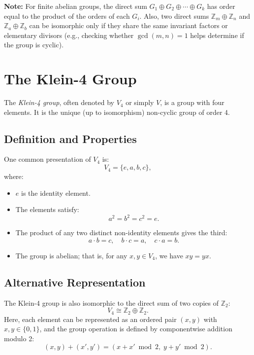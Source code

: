 \documentclass[12pt]{article}
\theoremstyle{definition} %
\theoremstyle{plain} %
\begin{document}
\noindent
\textbf{Note:} For finite abelian groups, the direct sum \(G_1 \oplus G_2 \oplus \cdots \oplus G_k\) 
has order equal to the product of the orders of each \(G_i\). Also, two direct sums 
\(\mathbb{Z}_m \oplus \mathbb{Z}_n\) and \(\mathbb{Z}_a \oplus \mathbb{Z}_b\) can be 
isomorphic only if they share the same invariant factors or elementary divisors 
(e.g., checking whether \(\gcd(m,n) = 1\) helps determine if the group is cyclic).


\section*{The Klein-4 Group}

The \emph{Klein-4 group}, often denoted by \(V_4\) or simply \(V\), is a group with four elements. It is the unique (up to isomorphism) non-cyclic group of order 4.

\subsection*{Definition and Properties}
One common presentation of \(V_4\) is:
\[
V_4 = \{e, a, b, c\},
\]
where:
\begin{itemize}
  \item \(e\) is the identity element.
  \item The elements satisfy:
    \[
      a^2 = b^2 = c^2 = e.
    \]
  \item The product of any two distinct non-identity elements gives the third:
    \[
      a \cdot b = c,\quad b \cdot c = a,\quad c \cdot a = b.
    \]
  \item The group is abelian; that is, for any \(x,y \in V_4\), we have \(xy = yx\).
\end{itemize}

\subsection*{Alternative Representation}
The Klein-4 group is also isomorphic to the direct sum of two copies of \(\mathbb{Z}_2\):
\[
V_4 \cong \mathbb{Z}_2 \oplus \mathbb{Z}_2.
\]
Here, each element can be represented as an ordered pair \((x,y)\) with \(x,y \in \{0,1\}\), and the group operation is defined by componentwise addition modulo 2:
\[
(x,y) + (x',y') = (x+x' \bmod 2,\; y+y' \bmod 2).
\]
\end{document}
